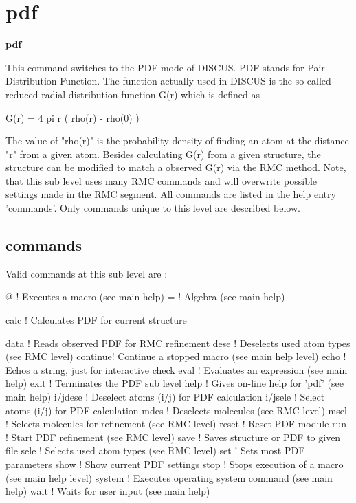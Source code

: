 \section{pdf}
{\bf pdf \par }
\par
\vspace{3pt}
This command switches to the PDF mode of DISCUS. PDF stands 
for Pair-Distribution-Function. The function actually used in 
DISCUS is the so-called reduced radial distribution function 
G(r) which is defined as 
\par
\begin{MacVerbatim}
  G(r) = 4 pi r ( rho(r) - rho(0) )
\end{MacVerbatim}
The value of "rho(r)" is the probability density of finding an 
atom at the distance "r" from a given atom. Besides calculating 
G(r) from a given structure, the structure can be modified to 
match a observed G(r) via the RMC method. Note, that this sub level 
uses many RMC commands and will overwrite possible settings made 
in the RMC segment. All commands are listed in the help entry 
'commands'. Only commands unique to this level are described 
below. 
\par
\subsection*{commands}
Valid commands at this sub level are : 
\par
\begin{MacVerbatim}
@       ! Executes a macro (see main help)
=       ! Algebra (see main help)
\end{MacVerbatim}
calc    ! Calculates PDF for current structure 
\begin{MacVerbatim}
data    ! Reads observed PDF for RMC refinement
dese    ! Deselects used atom types (see RMC level)
continue! Continue a stopped macro (see main help level)
echo    ! Echos a string, just for interactive check
eval    ! Evaluates an expression (see main help)
exit    ! Terminates the PDF sub level
help    ! Gives on-line help for 'pdf' (see main help)
i/jdese ! Deselect atoms (i/j) for PDF calculation
i/jsele ! Select atoms (i/j) for PDF calculation
mdes    ! Deselects molecules (see RMC level)
msel    ! Selects molecules for refinement (see RMC level)
reset   ! Reset PDF module
run     ! Start PDF refinement (see RMC level)
save    ! Saves structure or PDF to given file
sele    ! Selects used atom types (see RMC level)
set     ! Sets most PDF parameters
show    ! Show current PDF settings
stop    ! Stops execution of a macro (see main help level)
system  ! Executes operating system command (see main help)
wait    ! Waits for user input (see main help)
\end{MacVerbatim}
